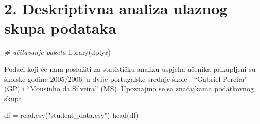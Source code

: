 \documentclass[
]{article}
\newenvironment{Shaded}{\begin{snugshade}}{\end{snugshade}}
\newcommand{\CommentTok}[1]{\textcolor[rgb]{0.56,0.35,0.01}{\textit{#1}}}
\newcommand{\FunctionTok}[1]{\textcolor[rgb]{0.00,0.00,0.00}{#1}}
\newcommand{\NormalTok}[1]{#1}
\newcommand{\OtherTok}[1]{\textcolor[rgb]{0.56,0.35,0.01}{#1}}
\newcommand{\StringTok}[1]{\textcolor[rgb]{0.31,0.60,0.02}{#1}}
\begin{document}
\hypertarget{deskriptivna-analiza-ulaznog-skupa-podataka}{%
\section{2. Deskriptivna analiza ulaznog skupa
podataka}\label{deskriptivna-analiza-ulaznog-skupa-podataka}}

\begin{Shaded}
\begin{Highlighting}[]
\CommentTok{\# učitavanje paketa}
\FunctionTok{library}\NormalTok{(dplyr)}
\end{Highlighting}
\end{Shaded}

Podaci koji će nam poslužiti za statističku analizu uspjeha učenika
prikupljeni su školske godine 2005/2006. u dvije portugalske srednje
škole - ``Gabriel Pereira'' (GP) i ``Mousinho da Silveira'' (MS).
Upoznajmo se sa značajkama podatkovnog skupa.

\begin{Shaded}
\begin{Highlighting}[]
\NormalTok{df }\OtherTok{=} \FunctionTok{read.csv}\NormalTok{(}\StringTok{"student\_data.csv"}\NormalTok{)}
\FunctionTok{head}\NormalTok{(df)}
\end{Highlighting}
\end{Shaded}
\end{document}
